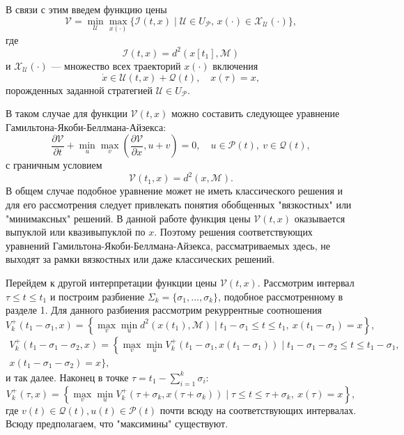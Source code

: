 В связи с этим введем функцию цены 
\begin{equation}
    \mathcal{V} = \min_{\mathcal{U}} \max_{x(\cdot)} \{\mathcal{I}(t,x) \mid \mathcal{U} \in 
     U_{\mathcal{P}}, \, x(\cdot) \in \mathcal{X}_{\mathcal{U}}(\cdot) \},
\end{equation}
где
\[
     \mathcal{I}(t,x) = d^2(x[t_1], \mathcal{M})
\]
и \( \mathcal{X}_{\mathcal{U}}(\cdot) \) --- множество всех траекторий \( x(\cdot) \) включения
\begin{equation}
    \dot{x} \in \mathcal{U}(t,x) + \mathcal{Q}(t), \quad x(\tau) = x,
\end{equation}
порожденных заданной стратегией \( \mathcal{U} \in U_{\mathcal{P}} \).

В таком случае для функции \( \mathcal{V}(t,x) \) можно составить следующее уравнение 
 Гамильтона-Якоби-Беллмана-Айзекса:
\begin{equation}\label{HJBI}
    \frac{\partial \mathcal{V}}{\partial t} + \min_u \max_v \left( \frac{\partial \mathcal{V}}
     {\partial x}, u + v \right) = 0, \quad u \in \mathcal{P}(t), \ v \in \mathcal{Q}(t),
\end{equation}
с граничным условием
\begin{equation}\label{HJBI_boundary}
    \mathcal{V}(t_1, x) = d^2(x, \mathcal{M}).
\end{equation}
В общем случае подобное уравнение может не иметь классического решения и для его рассмотрения
 следует привлекать понятия обобщенных "вязкостных" или "минимаксных" решений. В данной работе
 функция цены \( \mathcal{V}(t,x) \) оказывается выпуклой или квазивыпуклой по \( x \). Поэтому
 решения соответствующих уравнений Гамильтона-Якоби-Беллмана-Айзекса, рассматриваемых здесь, не
 выходят за рамки вязкостных или даже классических решений.

Перейдем к другой интерпретации функции цены \( \mathcal{V}(t,x) \). Рассмотрим интервал 
 \( \tau \le t \le t_1 \) и построим разбиение \( \Sigma_k = \{ \sigma_1, \dots, \sigma_k \} \),
 подобное рассмотренному в разделе 1. Для данного разбиения рассмотрим рекуррентные соотношения
\begin{equation*}
    V_k^+(t_1 - \sigma_1, x) = \left\{ \max_v \min_u d^2(x(t_1), \mathcal{M}) \mid t_1 -
     \sigma_1 \le t \le t_1, \ x(t_1 - \sigma_1) = x \right\},
\end{equation*}
\begin{multline*} 
    V_k^+(t_1 - \sigma_1 - \sigma_2, x) = \left\{ \max_v \min_u V_k^+(t_1 - \sigma_1, x(t_1 -
     \sigma_1)) \mid t_1 - \sigma_1 - \sigma_2 \le t \le t_1 - \sigma_1, \right. \\ 
    x(t_1 - \sigma_1 - \sigma_2) = x \Big\},
\end{multline*}
и так далее. Наконец в точке \( \tau = t_1 - \sum\limits_{i = 1}^k \sigma_i \):
\begin{equation*}
    V_k^+(\tau, x) = \left\{ \max_v \min_u V_k^+ (\tau + \sigma_k, x(\tau + \sigma_k)) \mid
     \tau \le t \le \tau + \sigma_k, \ x(\tau) = x \right\},
\end{equation*}
где \( v(t) \in \mathcal{Q}(t), u(t) \in  \mathcal{P}(t) \) почти всюду на соответствующих
 интервалах. Всюду предполагаем, что "максимины" существуют.

